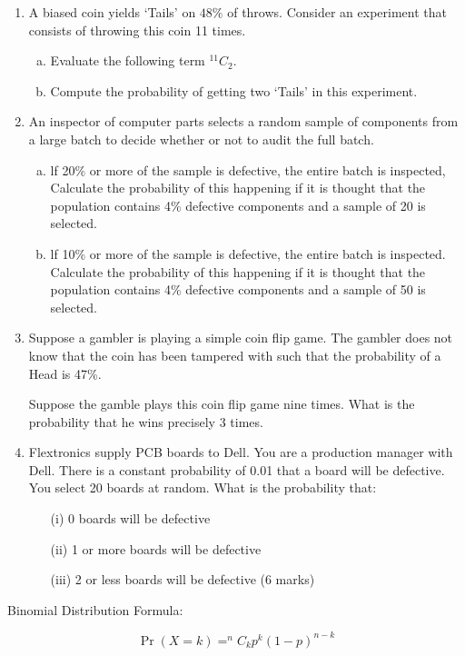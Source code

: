 \documentclass[a4paper,12pt]{article}
\begin{document}
\begin{enumerate}
\item A biased coin yields `Tails' on $48\%$ of throws. Consider an experiment that consists of throwing this coin 11 times.
\begin{enumerate}[(a)]
	\item Evaluate the following term $^{11}C_2$.
	\item Compute the probability of getting two `Tails' in this experiment.
\end{enumerate}

\newpage

\item 
An inspector of computer parts selects a random sample of components
from a large batch to decide whether or not to audit the full batch.

\begin{enumerate}[(a)]
	\item lf 20\% or more of the sample is defective, the entire batch is
	inspected, Calculate the probability of this happening if it is
	thought that the population contains 4\% defective components and
	a sample of 20 is selected.
	\item lf 10\% or more of the sample is defective, the entire batch is
	inspected. Calculate the probability of this happening if it is
	thought that the population contains 4\% defective components and
	a sample of 50 is selected.
	
\end{enumerate}

\item 
Suppose a gambler is playing a simple coin flip game. 
The gambler does not know that the coin has been tampered with such that the probability of a Head is 47\%.

Suppose the gamble plays this coin flip game nine times. 
What is the probability that he wins precisely 3 times.
\item	Flextronics supply PCB boards to Dell.  You are a production manager with Dell.  There is a constant probability of 0.01 that a board will be defective.  You select 20 boards at random.  What is the probability that:
\begin{itemize}
	\item[(i)]	0 boards will be defective
	\item[(ii)]	1 or more boards will be defective
	\item[(iii)]	2 or less boards will be defective			
	(6 marks)
\end{itemize}

	\end{enumerate}
\begin{framed}
\noindent Binomial Distribution Formula:

\[\Pr(X = k) = ^nC_k p^k
(1 − p)^{n−k}\]	
\end{framed}
	
\end{document}
